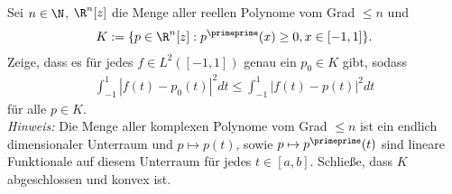 \begin{exercise}
Sei $n \in \N$, $\R^n[z]$ die Menge aller reellen Polynome vom Grad $\leq n$ und
\begin{align*}
  K := \{p \in \R^n[z]: p^{\primeprime}(x) \geq 0, x \in [-1,1]\}.
\end{align*}
Zeige, dass es für jedes $f \in L^2([-1,1])$ genau ein $p_0 \in K$ gibt, sodass
\begin{align*}
  \int_{-1}^{1}|f(t)-p_0(t)|^2 dt \leq \int_{-1}^1 |f(t) - p(t)|^2 dt
\end{align*}
für alle $p \in K$. \\
\textit{Hinweis:} Die Menge aller komplexen Polynome vom Grad $\leq n$ ist ein
endlich dimensionaler Unterraum und $p \mapsto p(t)$, sowie $p \mapsto p^{\primeprime}(t)$
sind lineare Funktionale auf diesem Unterraum für jedes $t \in [a,b]$. Schließe,
dass $K$ abgeschlossen und konvex ist.
\end{exercise}
